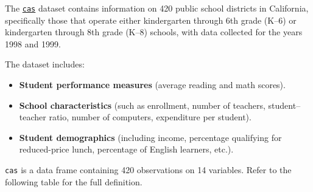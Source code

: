 \documentclass[
  12pt,
  letterpaper,
]{scrbook}
\providecommand{\tightlist}{%
  \setlength{\itemsep}{0pt}\setlength{\parskip}{0pt}}
\renewcommand{\tightlist}{\setlength{\itemsep}{0.5\baselineskip}\setlength{\parskip}{0.2\baselineskip}}
\theoremstyle{plain}
\theoremstyle{definition}
\theoremstyle{remark}
\begin{document}
The
\href{https://www.rdocumentation.org/packages/AER/versions/1.2-15/topics/CASchools}{\texttt{cas}}
dataset contains information on 420 public school districts in
California, specifically those that operate either kindergarten through
6th grade (K--6) or kindergarten through 8th grade (K--8) schools, with
data collected for the years 1998 and 1999.

The dataset includes:

\begin{itemize}
\tightlist
\item
  \textbf{Student performance measures} (average reading and math
  scores).
\item
  \textbf{School characteristics} (such as enrollment, number of
  teachers, student--teacher ratio, number of computers, expenditure per
  student).
\item
  \textbf{Student demographics} (including income, percentage qualifying
  for reduced-price lunch, percentage of English learners, etc.).
\end{itemize}

\texttt{cas} is a data frame containing 420 observations on 14
variables. Refer to the following table for the full definition.
\end{document}
